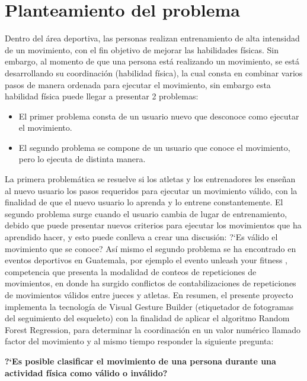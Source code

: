 \chapter{Planteamiento del problema}
Dentro del \'area deportiva, las personas realizan entrenamiento de alta intensidad de un movimiento, con el fin objetivo de mejorar las habilidades f\'isicas. Sin embargo, al momento de que una persona est\'a realizando un movimiento, se est\'a desarrollando su coordinaci\'on (habilidad f\'isica), la cual consta en combinar varios pasos de manera ordenada para ejecutar el movimiento, sin embargo esta habilidad f\'isica puede llegar a presentar 2 problemas:
\begin{itemize}
	\item El primer problema consta de un usuario nuevo que desconoce como ejecutar el movimiento.
	\item El segundo problema se compone de un usuario que conoce el movimiento, pero lo ejecuta de distinta manera.
\end{itemize} 
La primera problem\'atica se resuelve si los atletas y los entrenadores les ense\~nan al nuevo usuario los pasos requeridos para ejecutar un movimiento v\'alido, con la finalidad de que el nuevo usuario lo aprenda y lo entrene constantemente.
\medbreak
El segundo problema surge cuando el usuario cambia de lugar de entrenamiento, debido que puede presentar nuevos criterios para ejecutar los movimientos que ha aprendido hacer, y esto puede conlleva a crear una discusi\'on: ?`Es v\'alido el movimiento que se conoce?
\medbreak
\medbreak
As\'i mismo el segundo problema se ha encontrado en eventos deportivos en Guatemala, por ejemplo el evento unleash your fitness \cite{unleash}, competencia que presenta la modalidad de conteos de repeticiones de movimientos, en donde ha surgido conflictos de contabilizaciones de repeticiones de  movimientos v\'alidos entre jueces y atletas.
\medbreak
\medbreak
En resumen, el presente proyecto implementa la tecnolog\'ia de Visual Gesture Builder (etiquetador de fotogramas del seguimiento del esqueleto) con la finalidad de aplicar el algoritmo Random Forest Regression, para determinar la coordinaci\'on en un valor num\'erico llamado factor del movimiento y al mismo tiempo responder la siguiente pregunta:
\medbreak
\medbreak
\begin{center}
\textbf{?`Es posible clasificar el movimiento de una persona durante una actividad f\'isica como v\'alido o inv\'alido?}
\end{center}





